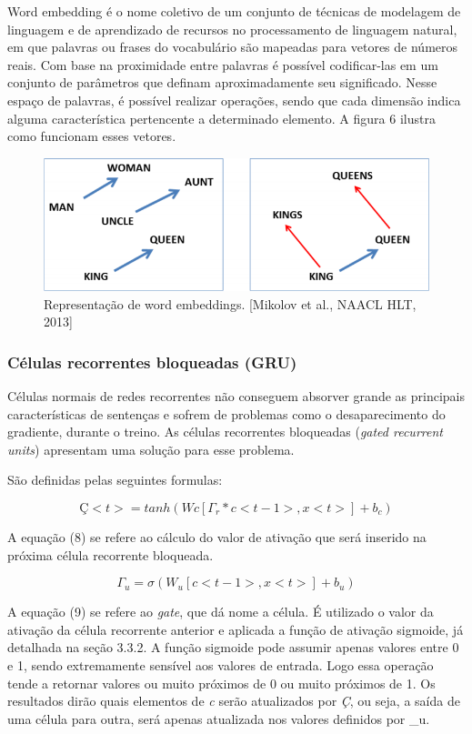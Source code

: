 \documentclass[12pt]{article}
\begin{document}
Word embedding é o nome coletivo de um conjunto de técnicas de modelagem de linguagem e de aprendizado de recursos no processamento de linguagem natural, em que palavras ou frases do vocabulário são mapeadas para vetores de números reais. Com base na proximidade entre palavras é possível codificar-las em um conjunto de parâmetros que definam aproximadamente seu significado. Nesse espaço de palavras, é possível realizar operações, sendo que cada dimensão indica alguma característica pertencente a determinado elemento. A figura 6 ilustra como funcionam esses vetores.
\begin{figure}
  \centering
  \includegraphics[width=1\textwidth]{images/wordembeddings.png}
  \caption{
    Representação de word embeddings. [Mikolov et al., NAACL HLT, 2013]
  }
  \label{}
\end{figure}

\subsubsection{Células recorrentes bloqueadas (GRU)}

Células normais de redes recorrentes não conseguem absorver grande as principais características de sentenças e sofrem de problemas como o desaparecimento do gradiente, durante o treino. As células recorrentes bloqueadas (\textit{gated recurrent units}) apresentam uma solução para esse problema.

São definidas pelas seguintes formulas:

\begin{equation}
    Ç<t> = tanh(Wc[\Gamma_r * c<t-1>, x<t>]+b_c)
\end{equation}

A equação (8) se refere ao cálculo do valor de ativação que será inserido na próxima célula recorrente bloqueada.

\begin{equation}
    \Gamma_u = \sigma(W_u[c<t-1>, x<t>]+b_u)
\end{equation}

A equação (9) se refere ao \textit{gate}, que dá nome a célula. É utilizado o valor da ativação da célula recorrente anterior e aplicada a função de ativação sigmoide, já detalhada na seção 3.3.2. A função sigmoide pode assumir apenas valores entre 0 e 1, sendo extremamente sensível aos valores de entrada. Logo essa operação tende a retornar valores ou muito próximos de 0 ou muito próximos de 1. Os resultados dirão quais elementos de \textit{c} serão atualizados por \textit{Ç}, ou seja, a saída de uma célula para outra, será apenas atualizada nos valores definidos por \Gamma_u.
\end{document}
